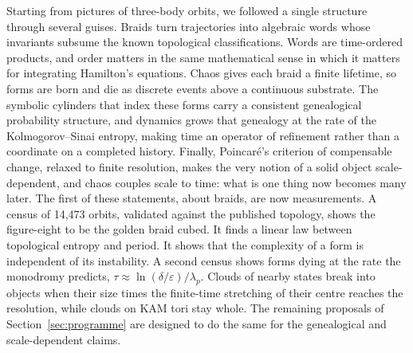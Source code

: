 \documentclass[11pt]{article}
\theoremstyle{remark}
\begin{document}
Starting from pictures of three-body orbits, we followed a single structure through several guises. Braids
turn trajectories into algebraic words whose invariants subsume the known topological classifications. Words
are time-ordered products, and order matters in the same mathematical sense in which it matters for
integrating Hamilton's equations. Chaos gives each braid a finite lifetime, so forms are born and die as
discrete events above a continuous substrate. The symbolic cylinders that index these forms carry a consistent
genealogical probability structure, and dynamics grows that genealogy at the rate of the Kolmogorov--Sinai
entropy, making time an operator of refinement rather than a coordinate on a completed history. Finally,
Poincar\'e's criterion of compensable change, relaxed to finite resolution, makes the very notion of a solid
object scale-dependent, and chaos couples scale to time: what is one thing now becomes many later. The
first of these statements, about braids, are now measurements. A census of 14{,}473 orbits, validated against the
published topology, shows the figure-eight to be the golden braid cubed. It finds a linear law between
topological entropy and period. It shows that the complexity of a form is independent of its instability. A second census shows forms dying at
the rate the monodromy predicts, $\tau\approx\ln(\delta/\varepsilon)/\lambda_p$. Clouds of nearby states break into
objects when their size times the finite-time stretching of their centre reaches the resolution, while clouds on
KAM tori stay whole.
The remaining proposals of Section~\ref{sec:programme} are designed to do the same for the genealogical and
scale-dependent claims.
\end{document}
